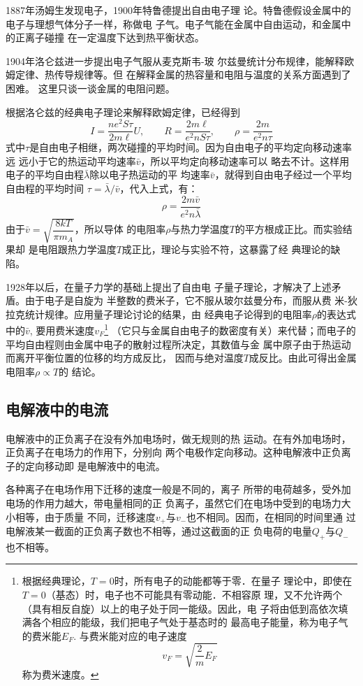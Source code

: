 1887年汤姆生发现电子，1900年特鲁德提出自由电子理
论。特鲁德假设金属中的电子与理想气体分子一样，称做电
子气。电子气能在金属中自由运动，和金属中的正离子碰撞
在一定温度下达到热平衡状态。

1904年洛仑兹进一步提出电子气服从麦克斯韦-玻
尔兹曼统计分布规律，能解释欧姆定律、热传导规律等。但
在解释金属的热容量和电阻与温度的关系方面遇到了困难。
这里只谈一谈金属的电阻问题。

根据洛仑兹的经典电子理论来解释欧姆定律，已经得到
\[I=\frac{n e^{2} S \tau}{2 m \ell} U , \qquad R=\frac{2 m \ell}{e^{2} n S \tau} ,\qquad \rho=\frac{2 m}{e^{2} n \tau}\]
式中$\tau$是自由电子相继，两次碰撞的平均时间。因为自由电子的平均定向移动速率远
远小于它的热运动平均速率$\bar v$，所以平均定向移动速率可以
略去不计。这样用电子的平均自由程$\bar\lambda$除以电子热运动的平
均速率$\bar v$，就得到自由电子经过一个平均自由程的平均时间
$\tau=\bar\lambda/\bar v$，代入上式，有：
\[\rho=\frac{2m\bar v}{e^2n\bar\lambda}\]
由于$\bar v=\sqrt{\dfrac{8kT}{\pi m_A}}$，所以导体
的电阻率$\rho$与热力学温度$T$的平方根成正比。而实验结果却
是电阻跟热力学温度$T$成正比，理论与实验不符，这暴露了经
典理论的缺陷。

1928年以后，在量子力学的基础上提出了自由电
子量子理论，才解决了上述矛盾。由于电子是自旋为
半整数的费米子，它不服从玻尔兹曼分布，而服从费
米-狄拉克统计规律。应用量子理论讨论的结果，由
经典电子论得到的电阻率$\rho$的表达式中的$\bar v$, 要用费米速度$v_F$\footnote{根据经典理论，$T=0$时，所有电子的动能都等于零．在量子
理论中，即使在$T=0$（基态）时，电子也不可能具有零动能．不相容原
理，又不允许两个（具有相反自旋）以上的电子处于同一能级。因此，电
子将由低到高依次填满各个相应的能级，我们把电子气处于基态时的
最高电子能量，称为电子气的费米能$E_F$. 与费米能对应的电子速度
\[v_F=\sqrt{\frac{2}{m}E_F}\]
称为费米速度。 }
（它只与金属自由电子的数密度有关）来代替；而电子的
平均自由程则由金属中电子的散射过程所决定，其数值与金
属中原子由于热运动而离开平衡位置的位移的均方成反比，
因而与绝对温度$T$成反比。由此可得出金属电阻率$\rho\propto T$的
结论。

\subsection{电解液中的电流}
电解液中的正负离子在没有外加电场时，做无规则的热
运动。在有外加电场时，正负离子在电场力的作用下，分别向
两个电极作定向移动。这种电解液中正负离子的定向移动即
是电解液中的电流。

各种离子在电场作用下迁移的速度一般是不同的，离子
所带的电荷越多，受外加电场的作用力越大，带电量相同的正
负离子，虽然它们在电场中受到的电场力大小相等，由于质量
不同，迁移速度$v_+$与$v_{-}$也不相同。因而，在相同的时间里通
过电解液某一截面的正负离子数也不相等，通过这截面的正
负电荷的电量$Q_+$与$Q_-$也不相等。

